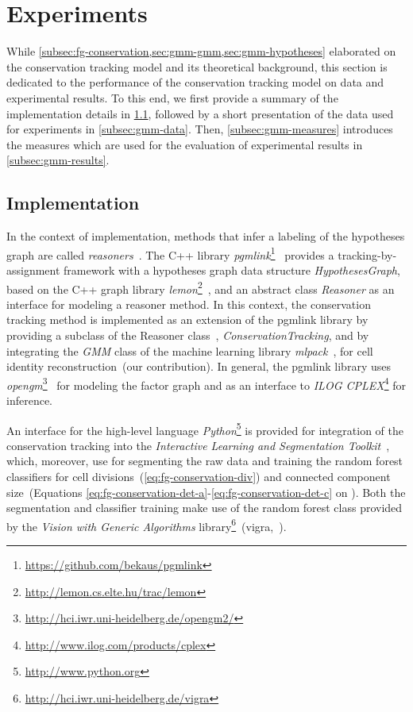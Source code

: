 \section{Experiments}
\label{sec:gmm-experiments}
While \cref{subsec:fg-conservation,sec:gmm-gmm,sec:gmm-hypotheses} elaborated on the conservation
tracking model and its theoretical background, this section is dedicated to the performance of the
conservation tracking model on data and experimental results. To this end, we first provide a
summary of the implementation details in \cref{subsec:gmm-impl}, followed by a short presentation of
the data used for experiments in \cref{subsec:gmm-data}. Then, \cref{subsec:gmm-measures} introduces
the measures which are used for the evaluation of experimental results in \cref{subsec:gmm-results}.


\subsection{Implementation}
\label{subsec:gmm-impl}
In the context of implementation, methods that infer a labeling of the hypotheses graph are called
\emph{reasoners}~\citep[15]{kausler_13_tracking}. The C++ library
\emph{pgmlink}\footnote{\url{https://github.com/bekaus/pgmlink}\nocite{kausler_12_pgmlink}}~\citep[Chapter~6.1]{kausler_13_tracking}
provides a tracking-by-assignment framework with a hypotheses graph data structure
\emph{HypothesesGraph}, based on the C++ graph library \emph{lemon}\footnote{\url{http://lemon.cs.elte.hu/trac/lemon}}~\citep{dezso_11_lemon}, and an abstract
class \emph{Reasoner} as an interface for modeling a reasoner method. In this context, the
conservation tracking method is implemented as an extension of the pgmlink library by providing a
subclass of the Reasoner class~\citep{schiegg_13_conservation}, \emph{ConservationTracking}, and by
integrating the \emph{GMM} class of the machine learning library \emph{mlpack}~\citep{mlpack2013},
for cell identity reconstruction~(our contribution). In general, the pgmlink library uses
\emph{opengm}\footnote{\url{http://hci.iwr.uni-heidelberg.de/opengm2/}}~\citep{andres_12_opengm} for
modeling the factor graph and as an interface to \emph{ILOG
    CPLEX}\footnote{\url{http://www.ilog.com/products/cplex}} for inference.

An interface for the high-level language \emph{Python}\footnote{\url{http://www.python.org}} is provided
for integration of the conservation tracking into the \emph{Interactive Learning and Segmentation
    Toolkit}~\citep{sommer_11_ilastik}, which, moreover, \citet{schiegg_13_conservation} use for
segmenting the raw data and training the random forest classifiers for cell
divisions~(\cref{eq:fg-conservation-div}) and connected component
size~(Equations \ref{eq:fg-conservation-det-a}-\ref{eq:fg-conservation-det-c} on \pageref{eq:fg-conservation-det-c}). Both the segmentation
and classifier training make use of the random forest class provided by the \emph{Vision with
    Generic Algorithms}
library\footnote{\url{http://hci.iwr.uni-heidelberg.de/vigra}}~(vigra,~\citealp{koethe_08_vigra}).

